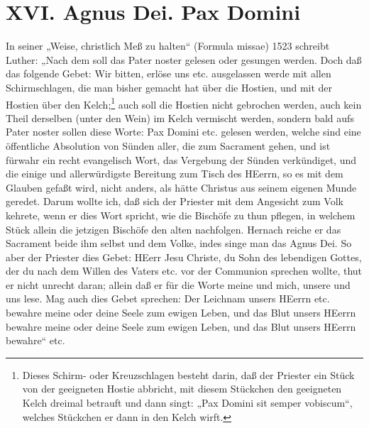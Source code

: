 





\chapter{XVI. Agnus Dei. Pax Domini}


In seiner „Weise, christlich Meß zu halten“ (Formula missae) 1523 schreibt Luther: „Nach dem soll das Pater noster gelesen oder gesungen werden. Doch daß das folgende Gebet: Wir bitten, erlöse uns etc. ausgelassen werde mit allen Schirmschlagen, die man bisher gemacht hat über die Hostien, und mit der Hostien über den Kelch;\footnote{Dieses Schirm- oder Kreuzschlagen besteht darin, daß der Priester ein Stück von der geeigneten Hostie abbricht, mit diesem Stückchen den geeigneten Kelch dreimal betrauft und dann singt: „Pax Domini sit semper vobiscum“, welches Stückchen er dann in den Kelch wirft.} auch soll die Hostien nicht gebrochen werden, auch kein Theil derselben (unter den Wein) im Kelch vermischt werden, sondern bald aufs Pater noster sollen diese Worte: Pax Domini etc. gelesen werden, welche sind eine öffentliche Absolution von Sünden aller, die zum Sacrament gehen, und ist fürwahr ein recht evangelisch Wort, das Vergebung der Sünden verkündiget, und die einige und allerwürdigste Bereitung zum Tisch des HEerrn, so es mit dem Glauben gefaßt wird, nicht anders, als hätte Christus aus seinem eigenen Munde geredet. Darum wollte ich, daß sich der Priester mit dem Angesicht zum Volk kehrete, wenn er dies Wort spricht, wie die Bischöfe zu thun pflegen, in welchem Stück allein die jetzigen Bischöfe den alten nachfolgen. Hernach reiche er das Sacrament beide ihm selbst und dem Volke, indes singe man das Agnus Dei. So aber der Priester dies Gebet: HEerr Jesu Christe, du Sohn des lebendigen Gottes, der du nach dem Willen des Vaters etc. vor der Communion sprechen wollte,
thut er nicht unrecht daran; allein daß er für die Worte meine und mich, unsere und uns lese. Mag auch dies Gebet sprechen: Der Leichnam unsers HEerrn etc. bewahre meine oder deine Seele zum ewigen Leben, und das Blut unsers HEerrn bewahre meine oder deine Seele zum ewigen Leben, und das Blut unsers HEerrn bewahre“ etc.

